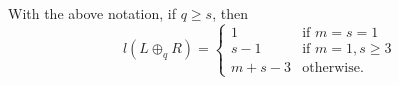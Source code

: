 \begin{proposition} \label{prop:L+R}
 With the above notation, if $q \ge s$, then 
 \[
 l(L \oplus_q R) = \begin{cases}
 1 &\text{if } m = s = 1\\
 s - 1 &\text{if } m = 1, s \ge 3\\
 m + s - 3 & \text{otherwise.}
 \end{cases}
 \]
\end{proposition}